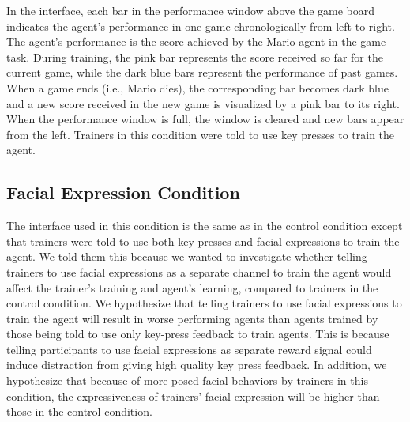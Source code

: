 In the interface, each bar in the performance window above the game board indicates the agent's performance in one game chronologically from left to right. The agent's performance is the score achieved by the Mario agent in the game task. During training, the pink bar represents the score received so far for the current game, while the dark blue bars represent the performance of past games. When a game ends (i.e., Mario dies), the corresponding bar becomes dark blue and a new score received in the new game is visualized by a pink bar to its right. When the performance window is full, the window is cleared and new bars appear from the left. Trainers in this condition were told to use key presses to train the agent.



\subsection{Facial Expression Condition}
The interface used in this condition is the same as in the control condition except that trainers were told to use both key presses and facial expressions to train the agent. We told them this because we wanted to investigate whether telling trainers to use facial expressions as a separate channel to train the agent would affect the trainer's training and agent's learning, compared to trainers in the control condition. We hypothesize that telling trainers to use facial expressions to train the agent will result in worse performing agents than agents trained by those being told to use only key-press feedback to train agents. This is because telling participants to use facial expressions as separate reward signal could induce %
distraction from giving high quality key press feedback. In addition, we hypothesize that because of more posed facial behaviors by trainers in this condition, the expressiveness of trainers' facial expression will be higher than those in the control condition. %

